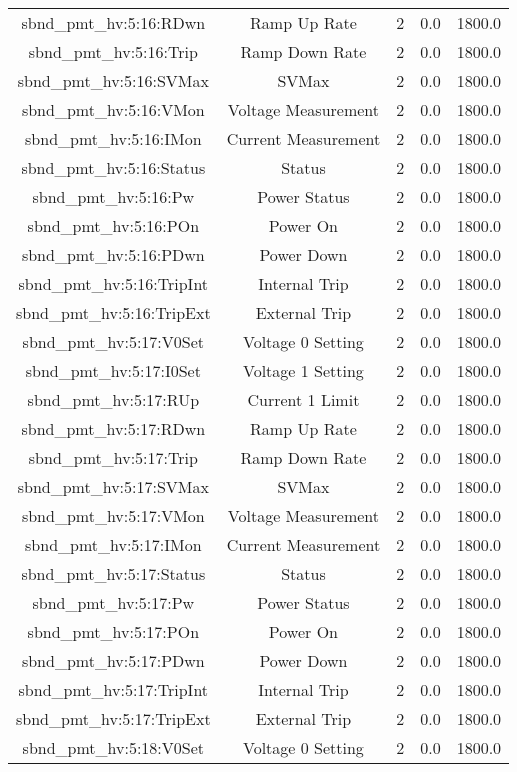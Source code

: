 \begin{table}[ptb]
\begin{tabular}{c | c c c c}
sbnd_pmt_hv:5:16:RDwn & Ramp Up Rate & 2 & 0.0 & 1800.0\\ 
sbnd_pmt_hv:5:16:Trip & Ramp Down Rate & 2 & 0.0 & 1800.0\\ 
sbnd_pmt_hv:5:16:SVMax & SVMax & 2 & 0.0 & 1800.0\\ 
sbnd_pmt_hv:5:16:VMon & Voltage Measurement & 2 & 0.0 & 1800.0\\ 
sbnd_pmt_hv:5:16:IMon & Current Measurement & 2 & 0.0 & 1800.0\\ 
sbnd_pmt_hv:5:16:Status & Status & 2 & 0.0 & 1800.0\\ 
sbnd_pmt_hv:5:16:Pw & Power Status & 2 & 0.0 & 1800.0\\ 
sbnd_pmt_hv:5:16:POn & Power On & 2 & 0.0 & 1800.0\\ 
sbnd_pmt_hv:5:16:PDwn & Power Down & 2 & 0.0 & 1800.0\\ 
sbnd_pmt_hv:5:16:TripInt & Internal Trip & 2 & 0.0 & 1800.0\\ 
sbnd_pmt_hv:5:16:TripExt & External Trip & 2 & 0.0 & 1800.0\\ 
sbnd_pmt_hv:5:17:V0Set & Voltage 0 Setting & 2 & 0.0 & 1800.0\\ 
sbnd_pmt_hv:5:17:I0Set & Voltage 1 Setting & 2 & 0.0 & 1800.0\\ 
sbnd_pmt_hv:5:17:RUp & Current 1 Limit & 2 & 0.0 & 1800.0\\ 
sbnd_pmt_hv:5:17:RDwn & Ramp Up Rate & 2 & 0.0 & 1800.0\\ 
sbnd_pmt_hv:5:17:Trip & Ramp Down Rate & 2 & 0.0 & 1800.0\\ 
sbnd_pmt_hv:5:17:SVMax & SVMax & 2 & 0.0 & 1800.0\\ 
sbnd_pmt_hv:5:17:VMon & Voltage Measurement & 2 & 0.0 & 1800.0\\ 
sbnd_pmt_hv:5:17:IMon & Current Measurement & 2 & 0.0 & 1800.0\\ 
sbnd_pmt_hv:5:17:Status & Status & 2 & 0.0 & 1800.0\\ 
sbnd_pmt_hv:5:17:Pw & Power Status & 2 & 0.0 & 1800.0\\ 
sbnd_pmt_hv:5:17:POn & Power On & 2 & 0.0 & 1800.0\\ 
sbnd_pmt_hv:5:17:PDwn & Power Down & 2 & 0.0 & 1800.0\\ 
sbnd_pmt_hv:5:17:TripInt & Internal Trip & 2 & 0.0 & 1800.0\\ 
sbnd_pmt_hv:5:17:TripExt & External Trip & 2 & 0.0 & 1800.0\\ 
sbnd_pmt_hv:5:18:V0Set & Voltage 0 Setting & 2 & 0.0 & 1800.0\\ 

\end{tabular}
\end{table}
